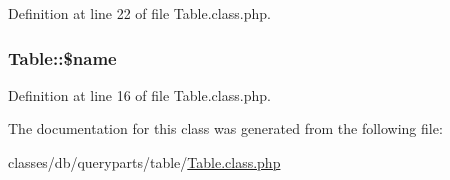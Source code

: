Definition at line 22 of file Table.\-class.\-php.

\hypertarget{classTable_a7c7f5d88257a02dd1fbeee22a77c7f39}{
\subsubsection[{\$name}]{\setlength{\rightskip}{0pt plus 5cm}Table\-::\$name}}\label{classTable_a7c7f5d88257a02dd1fbeee22a77c7f39}


Definition at line 16 of file Table.\-class.\-php.



The documentation for this class was generated from the following file\-:\begin{DoxyCompactItemize}
\item 
classes/db/queryparts/table/\hyperlink{Table_8class_8php}{Table.\-class.\-php}\end{DoxyCompactItemize}

